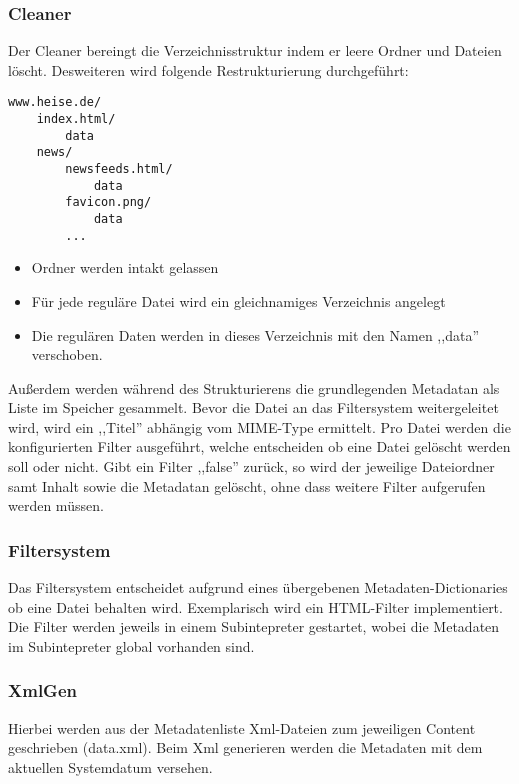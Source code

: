 \subsubsection{Cleaner}
\label{ssub:cleaner}
Der Cleaner bereingt die Verzeichnisstruktur indem er leere Ordner und Dateien löscht.
Desweiteren wird folgende Restrukturierung durchgeführt:
\begin{verbatim}
www.heise.de/ 
    index.html/
        data
    news/
        newsfeeds.html/
            data
        favicon.png/
            data
        ...
\end{verbatim}


\begin{itemize}
    \item Ordner werden intakt gelassen
    \item Für jede reguläre Datei wird ein gleichnamiges Verzeichnis angelegt
    \item Die regulären Daten werden in dieses Verzeichnis mit den Namen ,,data'' verschoben.
\end{itemize}

Außerdem werden während des Strukturierens die grundlegenden Metadatan als Liste im Speicher gesammelt.
Bevor die Datei an das Filtersystem weitergeleitet wird, wird ein ,,Titel'' abhängig vom MIME-Type ermittelt.
Pro Datei werden die konfigurierten Filter ausgeführt, welche entscheiden ob eine Datei gelöscht werden soll oder nicht.
Gibt ein Filter ,,false'' zurück, so wird der jeweilige Dateiordner samt Inhalt sowie die Metadatan gelöscht,
ohne dass weitere Filter aufgerufen werden müssen.

\subsubsection{Filtersystem}
\label{ssub:filtersystem}
Das Filtersystem entscheidet aufgrund eines übergebenen Metadaten-Dictionaries ob eine Datei behalten wird. Exemplarisch wird ein HTML-Filter
implementiert. Die Filter werden jeweils in einem Subintepreter gestartet, wobei die Metadaten im Subintepreter global vorhanden sind.


\subsubsection{XmlGen}
\label{ssub:xmlgen}
Hierbei werden aus der Metadatenliste Xml-Dateien zum jeweiligen Content geschrieben (data.xml). 
Beim Xml generieren werden die Metadaten mit dem aktuellen Systemdatum versehen.



